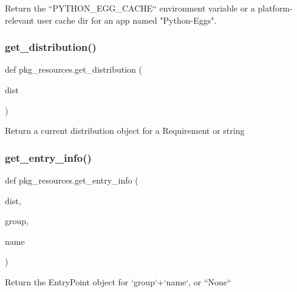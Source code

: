\begin{DoxyVerb}Return the ``PYTHON_EGG_CACHE`` environment variable
or a platform-relevant user cache dir for an app
named "Python-Eggs".
\end{DoxyVerb}
 \mbox{\label{namespacepkg__resources_a2855f6a8b340925bb37a05cca44c6858}} 
\subsubsection{\texorpdfstring{get\+\_\+distribution()}{get\_distribution()}}
{\footnotesize\ttfamily def pkg\+\_\+resources.\+get\+\_\+distribution (\begin{DoxyParamCaption}\item[{}]{dist }\end{DoxyParamCaption})}

\begin{DoxyVerb}Return a current distribution object for a Requirement or string\end{DoxyVerb}
 \mbox{\label{namespacepkg__resources_afbe243e1bf56cc04e07807c30e8b8145}} 
\subsubsection{\texorpdfstring{get\+\_\+entry\+\_\+info()}{get\_entry\_info()}}
{\footnotesize\ttfamily def pkg\+\_\+resources.\+get\+\_\+entry\+\_\+info (\begin{DoxyParamCaption}\item[{}]{dist,  }\item[{}]{group,  }\item[{}]{name }\end{DoxyParamCaption})}

\begin{DoxyVerb}Return the EntryPoint object for `group`+`name`, or ``None``\end{DoxyVerb}
 \mbox{\label{namespacepkg__resources_ad16e5d5879cbf9b5302b755ae1d0e5c2}} 
